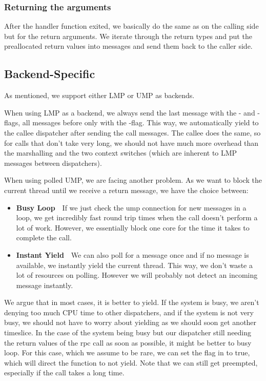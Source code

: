 \subsubsection{Returning the arguments}
After the handler function exited, we basically do the same as on the calling side but for
the return arguments. We iterate through the return types and put the preallocated return values
into messages and send them back to the caller side.





\subsection{Backend-Specific}

As mentioned, we support either LMP or UMP as backends.

When using LMP as a backend, we always send the last message with the - and -flags, all messages before only with the -flag.
This way, we automatically yield to the callee dispatcher after sending the call messages.
The callee does the same, so for calls that don't take very long, we should not have much
more overhead than the marshalling and the two context switches (which are inherent to LMP messages
between dispatchers).


When using polled UMP, we are facing another problem. As we want to block the current
thread until we receive a return message, we have the choice between:

\begin{itemize}

    \item \textbf{Busy Loop}\ \ If we just check the ump connection for new messages in a loop,
    we get incredibly fast round trip times when the call doesn't perform a lot of work.
    However, we essentially block one core for the time it takes to complete the call.
    
    \item \textbf{Instant Yield}\ \ We can also poll for a message once and if no message
    is available, we instantly yield the current thread. This way, we don't waste a lot of
    resources on polling. However we will probably not detect an incoming message instantly.
    
\end{itemize}

We argue that in most cases, it is better to yield. If the system is busy, we aren't denying too
much CPU time to other dispatchers, and if the system is not very busy, we should not have to worry about yielding as we should soon get another timeslice. In the case of the system being busy
but our dispatcher still needing the return values of the rpc call as soon as possible, it
might be better to busy loop. For this case, which we assume to be rare, we can set the
 flag in  to true, which will direct the 
function to not yield. Note that we can still get preempted, especially if the call takes a long time.

